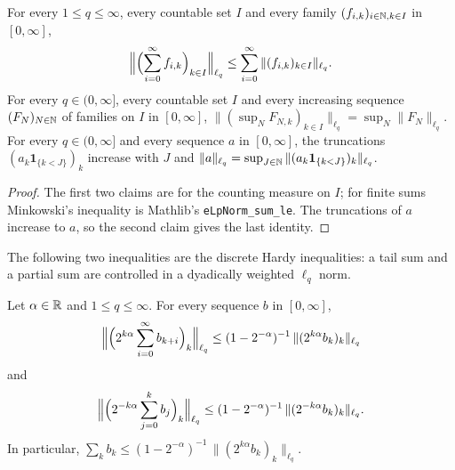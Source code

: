 \begin{lemma}
\label{lem:countable-minkowski}
\leanok
{}
For every $1 \leq q \leq \infty$, every countable set $I$ and every family
$(f_{i,k})_{i \in \mathbb{N}, k \in I}$ in $[0, \infty]$,
\[
  \Bigl\| \Bigl(\sum_{i=0}^\infty f_{i,k}\Bigr)_{k \in I} \Bigr\|_{\ell_q}
  \leq \sum_{i=0}^\infty \|(f_{i,k})_{k \in I}\|_{\ell_q} .
\]
For every $q \in (0, \infty]$, every countable set $I$ and every increasing sequence
$(F_N)_{N \in \mathbb{N}}$ of families on $I$ in $[0, \infty]$,
$\|(\sup_N F_{N,k})_{k \in I}\|_{\ell_q} = \sup_N \|F_N\|_{\ell_q}$.
For every $q \in (0, \infty]$ and every sequence $a$ in $[0, \infty]$, the truncations
$(a_k \mathbf 1_{\{k < J\}})_k$ increase with $J$ and
$\|a\|_{\ell_q} = \sup_{J \in \mathbb{N}} \|(a_k \mathbf 1_{\{k < J\}})_k\|_{\ell_q}$.
\end{lemma}

\begin{proof}
\leanok
{}
The first two claims are  for the counting measure on $I$; for
finite sums Minkowski's inequality is Mathlib's \texttt{eLpNorm\_sum\_le}. The truncations of
$a$ increase to $a$, so the second claim gives the last identity.
\end{proof}

The following two inequalities are the discrete Hardy inequalities: a tail sum and a partial
sum are controlled in a dyadically weighted $\ell_q$ norm.

\begin{lemma}
\label{lem:hardy}
\leanok
{}
Let $\alpha \in \mathbb{R}$ and $1 \leq q \leq \infty$. For every sequence $b$ in $[0, \infty]$,
\[
  \Bigl\| \Bigl(2^{k\alpha} \sum_{i=0}^\infty b_{k+i}\Bigr)_k \Bigr\|_{\ell_q}
  \leq (1 - 2^{-\alpha})^{-1} \, \|(2^{k\alpha} b_k)_k\|_{\ell_q}
\]
and
\[
  \Bigl\| \Bigl(2^{-k\alpha} \sum_{j=0}^{k} b_j\Bigr)_k \Bigr\|_{\ell_q}
  \leq (1 - 2^{-\alpha})^{-1} \, \|(2^{-k\alpha} b_k)_k\|_{\ell_q} .
\]
In particular, $\sum_k b_k \leq (1 - 2^{-\alpha})^{-1} \, \|(2^{k\alpha} b_k)_k\|_{\ell_q}$.
\end{lemma}

